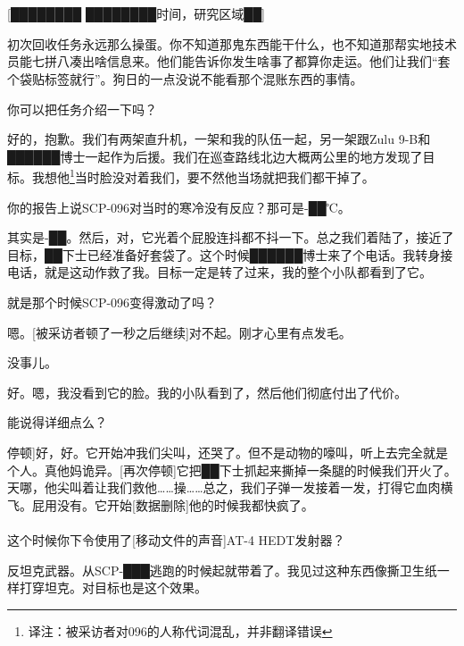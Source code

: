 \hr


\\
\\

\begin{scpbox}


{[}████████ ████████时间，研究区域██]

初次回收任务永远那么操蛋。你不知道那鬼东西能干什么，也不知道那帮实地技术员能七拼八凑出啥信息来。他们能告诉你发生啥事了都算你走运。他们让我们“套个袋贴标签就行”。狗日的一点没说不能看那个混账东西的事情。

你可以把任务介绍一下吗？

好的，抱歉。我们有两架直升机，一架和我的队伍一起，另一架跟Zulu 9-B和██████博士一起作为后援。我们在巡查路线北边大概两公里的地方发现了目标。我想他\footnote{译注：被采访者对096的人称代词混乱，并非翻译错误}当时脸没对着我们，要不然他当场就把我们都干掉了。

你的报告上说SCP-096对当时的寒冷没有反应？那可是-██℃。

其实是-██。然后，对，它光着个屁股连抖都不抖一下。总之我们着陆了，接近了目标，██下士已经准备好套袋了。这个时候██████博士来了个电话。我转身接电话，就是这动作救了我。目标一定是转了过来，我的整个小队都看到了它。

就是那个时候SCP-096变得激动了吗？

嗯。{[}被采访者顿了一秒之后继续]对不起。刚才心里有点发毛。

没事儿。

好。嗯，我没看到它的脸。我的小队看到了，然后他们彻底付出了代价。

能说得详细点么？

\bb{█████████上尉：}{[}停顿]好，好。它开始冲我们尖叫，还哭了。但不是动物的嚎叫，听上去完全就是个人。真他妈诡异。{[}再次停顿]它把██下士抓起来撕掉一条腿的时候我们开火了。天哪，他尖叫着让我们救他……操……总之，我们子弹一发接着一发，打得它血肉横飞。屁用没有。它开始{[}数据删除]他的时候我都快疯了。\\
\\
这个时候你下令使用了{[}移动文件的声音]AT-4 HEDT发射器？

反坦克武器。从SCP-███逃跑的时候起就带着了。我见过这种东西像撕卫生纸一样打穿坦克。对目标也是这个效果。


\end{scpbox}
